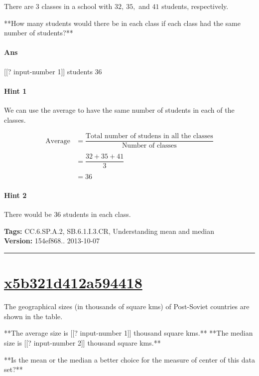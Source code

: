 \documentclass[twocolumn,10pt]{article}
\begin{document}
\noindent
There are $3$ classes in a school with $32, ~35,$ and $ 41$ students, respectively. 

**How many students would there be in each class  if each class had the same number of students?**

\paragraph{Ans} [[? input-number 1]] students  36

\paragraph{Hint 1}We can use the average to have the same number of students in each of the classes.

\begin{align*}\text{Average} &= \dfrac{\text{Total number of studens in all the classes}}{\text{Number of classes}}\\
\\
&= \dfrac{32+35+41}{3}\\
\\&=36\end{align*}

\paragraph{Hint 2}There would be $36$ students in each class.



\medskip
\noindent
\textbf{Tags:} {\footnotesize CC.6.SP.A.2, SB.6.1.I.3.CR, Understanding mean and median}\\
\textbf{Version:} 154ef868.. 2013-10-07
\smallskip\hrule





\section{\href{https://www.khanacademy.org/devadmin/content/items/x5b321d412a594418}{x5b321d412a594418}}

\noindent
The geographical sizes (in thousands of square kms) of Post-Soviet countries are shown in the table.

**The average size is  [[? input-number 1]] thousand square kms.**  
**The median size is [[? input-number 2]] thousand square kms.**

**Is the mean or the median a better choice for the measure of center of this data set?**
\end{document}
